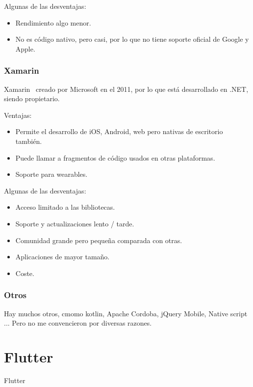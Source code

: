 Algunas de las desventajas:
\begin{itemize}
	\item Rendimiento algo menor.
	\item No es código nativo, pero casi, por lo que no tiene soporte oficial de Google y Apple.
\end{itemize}

\subsubsection{Xamarin}
Xamarin~\cite{wiki:xamarin} creado por Microsoft en el 2011, por lo que está desarrollado en .NET, siendo propietario.

Ventajas:
\begin{itemize}
	\item Permite el desarrollo de iOS, Android, web pero nativas de escritorio también.
	\item Puede llamar a fragmentos de código usados en otras plataformas.
	\item Soporte para wearables.
\end{itemize}

Algunas de las desventajas:
\begin{itemize}
	\item Acceso limitado a las bibliotecas.
	\item Soporte y actualizaciones lento / tarde.
	\item Comunidad grande pero pequeña comparada con otras.
	\item Aplicaciones de mayor tamaño.
	\item Coste.
\end{itemize}

\subsubsection{Otros}
Hay muchos otros, cmomo kotlin, Apache Cordoba, jQuery Mobile, Native script ...
Pero no me convencieron por diversas razones.
 
\section{Flutter}
Flutter
